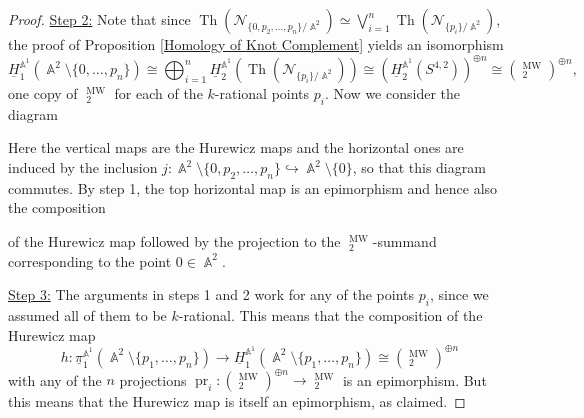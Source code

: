 \documentclass[english]{amsart}
\theoremstyle{definition}
\DeclareMathOperator{\A}{\mathbb{A}}
\DeclareMathOperator{\pr}{pr}
\DeclareMathOperator{\KK}{\underline{K}}
\DeclareMathOperator{\MW}{MW}
\DeclareMathOperator{\Th}{Th}
\begin{document}
\begin{proof}
\underline {Step 2:} Note that since $\Th(\mathcal{N}_{\{0,p_2,\dotsc,p_n\} /\A^2}) \simeq \bigvee_{i = 1}^n \Th(\mathcal{N}_{\{p_i\} /\A^2})$, the proof of Proposition \ref{Homology of Knot Complement} yields an isomorphism 
$$\underline{H}_1^{\A^1}\!(\A^2 \setminus \{ 0,\dots,p_n \}) \cong \bigoplus_{i = 1}^n \underline{H}_2^{\A^1}\!( \Th(\mathcal{N}_{\{p_i\} /\A^2})) \cong (\underline{H}_2^{\A^1}\!(S^{4,2}))^{\oplus n} \cong (\KK^{\MW}_2)^{\oplus n},$$
one copy of $\KK^{\MW}_2$ for each of the $k$-rational points $p_i$. Now we consider the diagram
\begin{center}
\end{center}
Here the vertical maps are the Hurewicz maps and the horizontal ones are induced by the inclusion $j \colon \A^2 \setminus \{ 0,p_2,\dots,p_n \} \hookrightarrow \A^2 \setminus \{ 0 \}$, so that this diagram commutes. By step 1, the top horizontal map is an epimorphism and hence also the composition 
\begin{center}
\end{center}
of the Hurewicz map followed by the projection to the $\KK^{\MW}_2$-summand corresponding to the point $0\in \A^2$.

\underline {Step 3:} The arguments in steps 1 and 2 work for any of the points $p_i$, since we assumed all of them to be $k$-rational. This means that the composition of the Hurewicz map
\[
h \colon \underline{\pi}_1^{\A^1}\!(\A^2 \setminus \{ p_1,\dots,p_n \}) \to \underline{H}_1^{\A^1}\!(\A^2 \setminus \{ p_1,\dots,p_n \}) \cong (\KK^{\MW}_2)^{\oplus n}
\]
with any of the $n$ projections $\pr_i\colon(\KK^{\MW}_2)^{\oplus n}\to\KK^{\MW}_2$ is an epimorphism. But this means that the Hurewicz map is itself an epimorphism, as claimed.
\end{proof}
\end{document}
